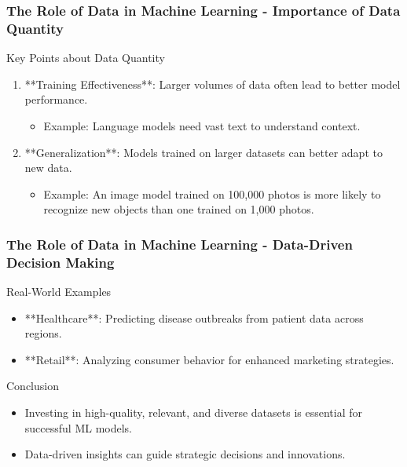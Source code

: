 \documentclass[aspectratio=169]{beamer}
\begin{document}
\begin{frame}[fragile]
    \frametitle{The Role of Data in Machine Learning - Importance of Data Quantity}
    \begin{block}{Key Points about Data Quantity}
        \begin{enumerate}
            \item **Training Effectiveness**: Larger volumes of data often lead to better model performance.
                \begin{itemize}
                    \item Example: Language models need vast text to understand context.
                \end{itemize}
                
            \item **Generalization**: Models trained on larger datasets can better adapt to new data.
                \begin{itemize}
                    \item Example: An image model trained on 100,000 photos is more likely to recognize new objects than one trained on 1,000 photos.
                \end{itemize}
        \end{enumerate}
    \end{block}
\end{frame}

\begin{frame}[fragile]
    \frametitle{The Role of Data in Machine Learning - Data-Driven Decision Making}
    \begin{block}{Real-World Examples}
        \begin{itemize}
            \item **Healthcare**: Predicting disease outbreaks from patient data across regions.
            \item **Retail**: Analyzing consumer behavior for enhanced marketing strategies.
        \end{itemize}
    \end{block}

    \begin{block}{Conclusion}
        \begin{itemize}
            \item Investing in high-quality, relevant, and diverse datasets is essential for successful ML models.
            \item Data-driven insights can guide strategic decisions and innovations.
        \end{itemize}
    \end{block}
\end{frame}
\end{document}
